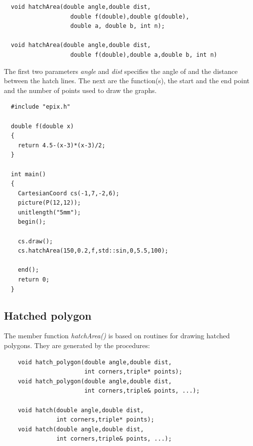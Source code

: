 \documentclass[12pt,a4paper]{article}
\begin{document}
  \begin{lstlisting}
  void hatchArea(double angle,double dist,
                   double f(double),double g(double),
                   double a, double b, int n);

  void hatchArea(double angle,double dist,
                   double f(double),double a,double b, int n)
  \end{lstlisting}

  The first two parameters \textit{angle} and \textit{dist} specifies the angle of
  and the distance between the hatch lines. The next are the function(s), the start
  and the end point and the number of points used to draw the graphs.

  \begin{minipage}{7.5cm}
    \begin{lstlisting}
  #include "epix.h"

  double f(double x)
  {
    return 4.5-(x-3)*(x-3)/2;
  }

  int main()
  {
    CartesianCoord cs(-1,7,-2,6);
    picture(P(12,12));
    unitlength("5mm");
    begin();

    cs.draw();
    cs.hatchArea(150,0.2,f,std::sin,0,5.5,100);

    end();
    return 0;
  }
    \end{lstlisting}
  \end{minipage}
  \begin{minipage}{5.5cm}
    
    \vspace{1.8cm}
  \end{minipage}


  \subsection{Hatched polygon}

  The member function \textit{hatchArea()} is based on routines for drawing
  hatched polygons. They are generated by the procedures:

  \begin{lstlisting}
    void hatch_polygon(double angle,double dist,
                       int corners,triple* points);
    void hatch_polygon(double angle,double dist,
                       int corners,triple& points, ...);

    void hatch(double angle,double dist,
               int corners,triple* points);
    void hatch(double angle,double dist,
               int corners,triple& points, ...);
  \end{lstlisting}
\end{document}
